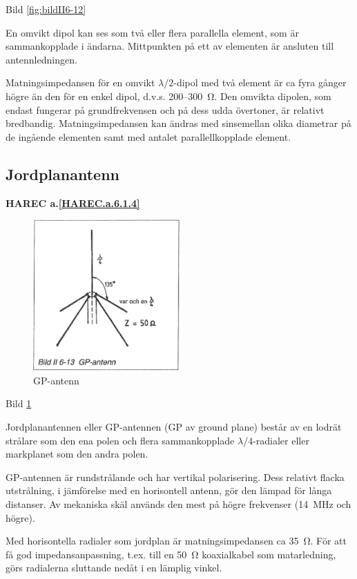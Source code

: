 Bild \ref{fig:bildII6-12}

En omvikt dipol kan ses som två eller flera parallella element, som är
sammankopplade i ändarna. Mittpunkten på ett av elementen är ansluten
till antennledningen.

Matningsimpedansen för en omvikt \(\lambda/2\)-dipol med två element är
ca fyra gånger högre än den för en enkel dipol, d.v.s. 200--300~Ω.
Den omvikta dipolen, som endast fungerar på grundfrekvensen och på
dess udda övertoner, är relativt bredbandig. Matningsimpedansen kan
ändras med sinsemellan olika diametrar på de ingående elementen samt
med antalet parallellkopplade element.

\subsection{Jordplanantenn}
\textbf{
HAREC a.\ref{HAREC.a.6.1.4}\label{myHAREC.a.6.1.4}
}

\begin{figure}
  \includegraphics[width=0.5\textwidth]{images/bild_2_6-13}
  \caption{GP-antenn}
  \label{fig:bildII6-13}
\end{figure}

Bild \ref{fig:bildII6-13}

Jordplanantennen eller GP-antennen (GP av ground plane) består av en
lodrät strålare som den ena polen och flera sammankopplade
\(\lambda/4\)-radialer eller markplanet som den andra polen.

GP-antennen är rundstrålande och har vertikal polarisering. Dess
relativt flacka utstrålning, i jämförelse med en horisontell antenn,
gör den lämpad för långa distanser.  Av mekaniska skäl används den
mest på högre frekvenser (14~MHz och högre).

Med horisontella radialer som jordplan är matningsimpedansen ca 35~Ω.
För att få god impedansanpassning, t.ex. till en 50~Ω koaxialkabel
som matarledning, görs radialerna sluttande nedåt i en lämplig vinkel.

